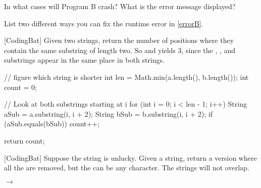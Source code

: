 \Q \label{errorB} In what cases will Program B crash? What is the error message displayed?

\begin{answer}
\end{answer}


\Q List two different ways you can fix the runtime error in \ref{errorB}.

\begin{answer}[3em]
\end{answer}




\newpage

[CodingBat] Given two strings, return the number of positions where they contain the same substring of length two. So  and  yields 3, since the , , and  substrings appear in the same place in both strings.

\medskip
\begin{javalst}
public int stringMatch(String a, String b) {
\end{javalst}

\vspace{-1em}
\begin{answer}[18em]
\begin{javalst}
    // figure which string is shorter
    int len = Math.min(a.length(), b.length());
    int count = 0;

    // Look at both substrings starting at i
    for (int i = 0; i < len - 1; i++) {
        String aSub = a.substring(i, i + 2);
        String bSub = b.substring(i, i + 2);
        if (aSub.equals(bSub)) {
            count++;
        }
    }

    return count;
\end{javalst}
\end{answer}

\begin{javalst}
}
\end{javalst}

\vfill

[CodingBat] Suppose the string  is unlucky. Given a string, return a version where all the  are removed, but the  can be any character. The  strings will not overlap.

\bigskip

 $\rightarrow$ 

